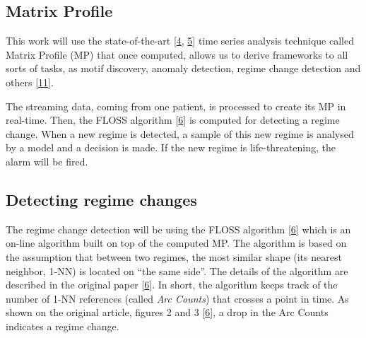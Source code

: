 \documentclass[runningheads]{llncs}
\begin{document}
\hypertarget{matrix-profile}{%
\subsection{Matrix Profile}\label{matrix-profile}}

This work will use the state-of-the-art {[}\protect\hyperlink{ref-DePaepe2020}{4}, \protect\hyperlink{ref-Feremans2020}{5}{]} time series analysis technique
called Matrix Profile (MP) that once computed, allows us to derive frameworks to all sorts of tasks,
as motif discovery, anomaly detection, regime change detection and others {[}\protect\hyperlink{ref-Yeh2017a}{11}{]}.

The streaming data, coming from one patient, is processed to create its MP in real-time. Then, the
FLOSS algorithm {[}\protect\hyperlink{ref-gharghabi2018}{6}{]} is computed for detecting a regime change. When a new regime is
detected, a sample of this new regime is analysed by a model and a decision is made. If the new
regime is life-threatening, the alarm will be fired.

\hypertarget{detecting-regime-changes}{%
\subsection{Detecting regime changes}\label{detecting-regime-changes}}

The regime change detection will be using the FLOSS algorithm {[}\protect\hyperlink{ref-gharghabi2018}{6}{]} which is an on-line
algorithm built on top of the computed MP. The algorithm is based on the assumption that between
two regimes, the most similar shape (its nearest neighbor, 1-NN) is located on ``the same side''. The
details of the algorithm are described in the original paper {[}\protect\hyperlink{ref-gharghabi2018}{6}{]}. In short, the
algorithm keeps track of the number of 1-NN references (called \emph{Arc Counts}) that crosses a point in
time. As shown on the original article, figures 2 and 3 {[}\protect\hyperlink{ref-gharghabi2018}{6}{]}, a drop in the Arc Counts
indicates a regime change.
\end{document}
